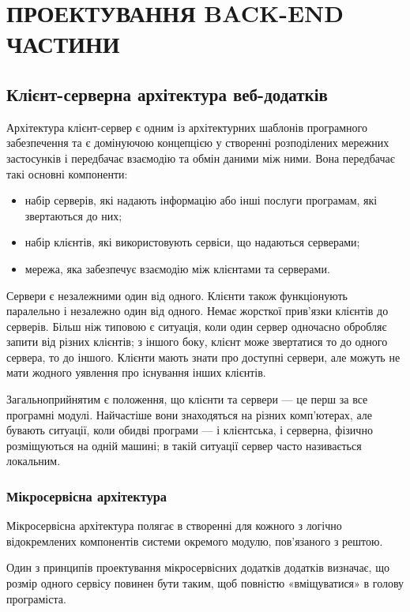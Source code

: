 \section{ПРОЕКТУВАННЯ BACK-END ЧАСТИНИ}

\subsection{Клієнт-серверна архітектура веб-додатків}

Архітектура клієнт-сервер є одним із архітектурних шаблонів програмного забезпечення та є домінуючою концепцією у створенні розподілених мережних застосунків і передбачає взаємодію та обмін даними між ними. Вона передбачає такі основні компоненти:
\begin{itemize}
	\item набір серверів, які надають інформацію або інші послуги програмам, які звертаються до них;
	\item набір клієнтів, які використовують сервіси, що надаються серверами;
	\item мережа, яка забезпечує взаємодію між клієнтами та серверами.
\end{itemize}

Сервери є незалежними один від одного. Клієнти також функціонують паралельно і незалежно один від одного. Немає жорсткої прив'язки клієнтів до серверів. Більш ніж типовою є ситуація, коли один сервер одночасно обробляє запити від різних клієнтів; з іншого боку, клієнт може звертатися то до одного сервера, то до іншого. Клієнти мають знати про доступні сервери, але можуть не мати жодного уявлення про існування інших клієнтів.

Загальноприйнятим є положення, що клієнти та сервери — це перш за все програмні модулі. Найчастіше вони знаходяться на різних комп'ютерах, але бувають ситуації, коли обидві програми — і клієнтська, і серверна, фізично розміщуються на одній машині; в такій ситуації сервер часто називається локальним.

\subsubsection{Мікросервісна архітектура}

Мікросервісна архітектура полягає в створенні для кожного з логічно відокремлених компонентів системи окремого модулю, пов'язаного з рештою.

Один з принципів проектування мікросервісних додатків додатків визначає, що розмір одного сервісу повинен бути таким, щоб повністю «вміщуватися» в голову програміста.

